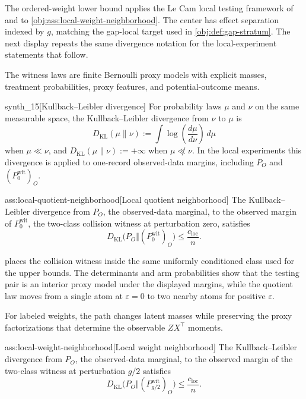 \documentclass[11pt]{article}
\begin{document}
The ordered-weight lower bound applies the Le Cam local testing framework of \citet{LeCam1986} and \citet{PolyanskiyWu2019} to \cref{obj:ass:local-weight-neighborhood}. The center has effect separation indexed by \(g\), matching the gap-local target used in \cref{obj:def:gap-stratum}. The next display repeats the same divergence notation for the local-experiment statements that follow.

The witness laws are finite Bernoulli proxy models with explicit masses, treatment probabilities, proxy features, and potential-outcome means.

\begin{definitionv}{synth_15}[Kullback--Leibler divergence]
For probability laws $\mu$ and $\nu$ on the same measurable space, the Kullback--Leibler divergence from $\nu$ to $\mu$ is
\[
D_{\mathrm{KL}}(\mu\|\nu):=\int \log\!\left(\frac{d\mu}{d\nu}\right)\,d\mu
\]
when $\mu\ll\nu$, and $D_{\mathrm{KL}}(\mu\|\nu):=+\infty$ when $\mu\not\ll\nu$. In the local experiments this divergence is applied to one-record observed-data margins, including $P_O$ and $(P_0^{\mathrm{wit}})_O$.
\end{definitionv}

\begin{assumptionv}{ass:local-quotient-neighborhood}[Local quotient neighborhood]
The Kullback--Leibler divergence from \(P_O\), the observed-data marginal, to the observed margin of \(P_0^{\mathrm{wit}}\), the two-class collision witness at perturbation zero, satisfies
\[
D_{\mathrm{KL}}\bigl(P_O\Vert (P_0^{\mathrm{wit}})_O\bigr)\le \frac{c_{\mathrm{loc}}}{n}.
\]
\end{assumptionv}

 places the collision witness inside the same uniformly conditioned class used for the upper bounds. The determinants and arm probabilities show that the testing pair is an interior proxy model under the displayed margins, while the quotient law moves from a single atom at \(\varepsilon=0\) to two nearby atoms for positive \(\varepsilon\).

For labeled weights, the path changes latent masses while preserving the proxy factorizations that determine the observable \(ZX^\top\) moments.

\begin{assumptionv}{ass:local-weight-neighborhood}[Local weight neighborhood]
The Kullback--Leibler divergence from \(P_O\), the observed-data marginal, to the observed margin of the two-class witness at perturbation \(g/2\) satisfies
\[
D_{\mathrm{KL}}\bigl(P_O\Vert (P_{g/2}^{\mathrm{wit}})_O\bigr)\le \frac{c_{\mathrm{loc}}}{n}.
\]
\end{assumptionv}
\end{document}
